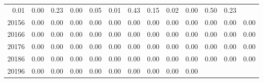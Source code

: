 \begin{table}[!h]
\begin{tabular}{lllllllllllll}
  \multicolumn{1}{|r}{0.01} &
  \multicolumn{1}{r}{0.00} &
  \multicolumn{1}{r}{0.23} &
  \multicolumn{1}{r}{0.00} &
  \multicolumn{1}{r}{0.05} &
  \multicolumn{1}{r}{0.01} &
  \multicolumn{1}{r}{0.43} &
  \multicolumn{1}{r}{0.15} &
  \multicolumn{1}{r}{0.02} &
  \multicolumn{1}{r}{0.00} &
  \multicolumn{1}{r}{0.50} &
  \multicolumn{1}{r}{0.23} \\
\multicolumn{1}{l}{\hspace{1em}20156} &
  \multicolumn{1}{|r}{0.00} &
  \multicolumn{1}{r}{0.00} &
  \multicolumn{1}{r}{0.00} &
  \multicolumn{1}{r}{0.00} &
  \multicolumn{1}{r}{0.00} &
  \multicolumn{1}{r}{0.00} &
  \multicolumn{1}{r}{0.00} &
  \multicolumn{1}{r}{0.00} &
  \multicolumn{1}{r}{0.00} &
  \multicolumn{1}{r}{0.00} &
  \multicolumn{1}{r}{0.00} &
  \multicolumn{1}{r}{0.00} \\
\multicolumn{1}{l}{\hspace{1em}20166} &
  \multicolumn{1}{|r}{0.00} &
  \multicolumn{1}{r}{0.00} &
  \multicolumn{1}{r}{0.00} &
  \multicolumn{1}{r}{0.00} &
  \multicolumn{1}{r}{0.00} &
  \multicolumn{1}{r}{0.00} &
  \multicolumn{1}{r}{0.00} &
  \multicolumn{1}{r}{0.00} &
  \multicolumn{1}{r}{0.00} &
  \multicolumn{1}{r}{0.00} &
  \multicolumn{1}{r}{0.00} &
  \multicolumn{1}{r}{0.00} \\
\multicolumn{1}{l}{\hspace{1em}20176} &
  \multicolumn{1}{|r}{0.00} &
  \multicolumn{1}{r}{0.00} &
  \multicolumn{1}{r}{0.00} &
  \multicolumn{1}{r}{0.00} &
  \multicolumn{1}{r}{0.00} &
  \multicolumn{1}{r}{0.00} &
  \multicolumn{1}{r}{0.00} &
  \multicolumn{1}{r}{0.00} &
  \multicolumn{1}{r}{0.00} &
  \multicolumn{1}{r}{0.00} &
  \multicolumn{1}{r}{0.00} &
  \multicolumn{1}{r}{0.00} \\
\multicolumn{1}{l}{\hspace{1em}20186} &
  \multicolumn{1}{|r}{0.00} &
  \multicolumn{1}{r}{0.00} &
  \multicolumn{1}{r}{0.00} &
  \multicolumn{1}{r}{0.00} &
  \multicolumn{1}{r}{0.00} &
  \multicolumn{1}{r}{0.00} &
  \multicolumn{1}{r}{0.00} &
  \multicolumn{1}{r}{0.00} &
  \multicolumn{1}{r}{0.00} &
  \multicolumn{1}{r}{0.00} &
  \multicolumn{1}{r}{0.00} &
  \multicolumn{1}{r}{0.00} \\
\multicolumn{1}{l}{\hspace{1em}20196} &
  \multicolumn{1}{|r}{0.00} &
  \multicolumn{1}{r}{0.00} &
  \multicolumn{1}{r}{0.00} &
  \multicolumn{1}{r}{0.00} &
  \multicolumn{1}{r}{0.00} &
  \multicolumn{1}{r}{0.00} &
  \multicolumn{1}{r}{0.00} &
  \multicolumn{1}{r}{0.00} &
  \multicolumn{1}{r}{0.00} &

\end{tabular}
\end{table}

